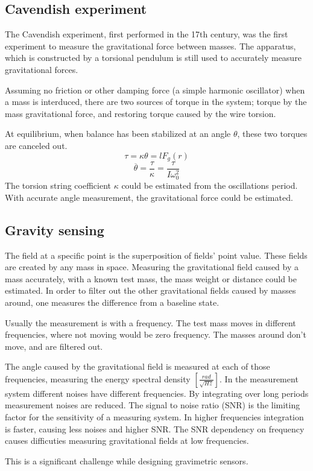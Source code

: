 \documentclass[\main/master.tex]{subfiles}
\begin{document}
\subsection{Cavendish experiment}
The Cavendish experiment, first performed in the 17th century, was the first experiment to measure the gravitational force between masses. The apparatus, which is constructed by a torsional pendulum is still used to accurately measure gravitational forces.
\par\noindent
Assuming no friction or other damping force (a simple harmonic oscillator) when a mass is interduced, there are two sources of torque in the system; torque by the mass gravitational force, and restoring torque caused by the wire torsion. 
\par\noindent
At equilibrium, when balance has been stabilized at an angle $\theta$, these two torques are canceled out.
\begin{equation}
\tau = \kappa\theta = lF_g(r)    \label{eqn:gravitation_torque}
\end{equation}
\begin{equation}
\overline{\theta} = \frac{\tau}{\kappa} = \frac{\tau}{I\omega_0^2}    \label{eqn:theta average}
\end{equation}
The torsion string coefficient $\kappa$ could be estimated from the oscillations period. With accurate angle measurement, the gravitational force could be estimated.
 

\subsection{Gravity sensing}
The field at a specific point is the superposition of fields' point value. These fields are created by any mass in space. Measuring the gravitational field caused by a mass accurately, with a known test mass, the mass weight or distance could be estimated. In order to filter out the other gravitational fields caused by masses around, one measures the difference from a baseline state.
\par\noindent
Usually the measurement is with a frequency. The test mass moves in different frequencies, where not moving would be zero frequency. The masses around don't move, and are filtered out.
\par\noindent
The angle caused by the gravitational field is measured at each of those frequencies, measuring the energy spectral density $[\frac{rad}{\sqrt{Hz}}]$.
In the measurement system different noises have different frequencies. By integrating over long periods measurement noises are reduced. The signal to noise ratio (SNR) is the limiting factor for the sensitivity of a measuring system. In higher frequencies integration is faster, causing less noises and higher SNR.
The SNR dependency on frequency causes difficuties measuring gravitational fields at low frequencies.
\par\noindent
This is a significant challenge while designing gravimetric sensors.
\end{document}
